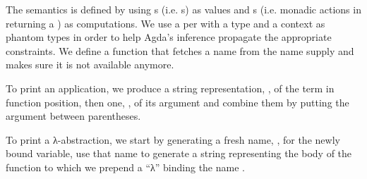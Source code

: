The  semantics is defined by using s (i.e. s)
as values and s (i.e. monadic actions in  returning a )
as computations. We use a per with a type and a context as phantom types
in order to help Agda's inference propagate the appropriate constraints. We define
a function  that fetches a name from the name supply and makes sure it is
not available anymore.

\begin{center}
\begin{minipage}{0.6\textwidth}
\end{minipage}

\begin{minipage}{0.45\textwidth}
\end{minipage}
\begin{minipage}{0.45\textwidth}
\end{minipage}
\end{center}


To print an application, we produce a string representation, , of the term in
function position, then one, , of its argument and combine them by putting the
argument between parentheses.

\begin{agdasnippet}
\end{agdasnippet}

To print a λ-abstraction, we start by generating a fresh name, , for the
newly bound variable, use that name to generate a string  representing the
body of the function to which we prepend a ``λ'' binding the name .

